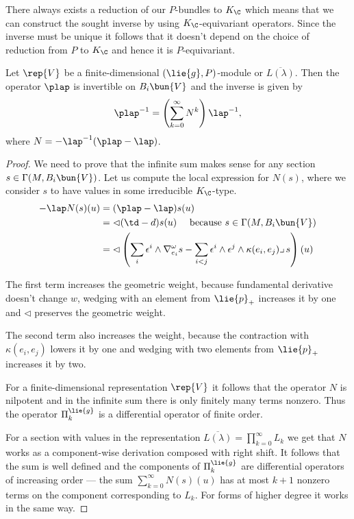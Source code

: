 There always exists a reduction of our $P$-bundles to $K_\C$ which means that we can construct the sought inverse by using $K_\C$-equivariant operators. Since the inverse must be unique it follows that it doesn't depend on the choice of reduction from $P$ to $K_\C$ and hence it is $P$-equivariant.

\begin{lemma}
Let $\rep{V}$  be a finite-dimensional $(\lie{g},P)$-module or $\overline{L(\lambda)}$. Then the operator $\plap$ is invertible on $B_i\bun{V}$ and the inverse is given by
\[
 \plap^{-1}=\left( \sum_{k=0}^\infty N^k \right) \lap^{-1},
\]
where $N=-\lap^{-1}(\plap-\lap)$.
\end{lemma}
\begin{proof}
 We need to prove that the infinite sum makes sense for any section $s\in\Gamma(M,B_{i}\bun{V})$. Let us compute the local expression for $N(s)$, where we consider $s$ to have values in some irreducible $K_\C$-type.
\begin{align*}
 -\lap N(s)(u) &= (\plap - \lap) s (u)\\
	    &= \lhd(\td - d) s (u) \quad\text{ because $s\in\Gamma(M,B_{i}\bun{V})$}\\
	  &= \lhd\left(\sum_i\epsilon^i\wedge\nabla^\omega_{e_i}s - \sum_{i <j} \epsilon^i\wedge\epsilon^j\wedge\kappa(e_i,e_j)  \lrcorner\, s \right)(u)
\end{align*}

 The first term increases the geometric weight, because fundamental derivative doesn't change $w$, wedging with an element from $\lie{p}_+$ increases it by one and $\lhd$ preserves the geometric weight.

The second term also increases the weight, because the contraction with $\kappa(e_i,e_j)$ lowers it by one and wedging with two elements from $\lie{p}_+$ increases it by two.

For a finite-dimensional representation $\rep{V}$ it follows that the operator $N$ is nilpotent and in the infinite sum there is only finitely many terms nonzero. Thus the operator $\Pi^\lie{g}_k$ is a differential operator of finite order.

For a section with values in the representation $\overline{L(\lambda)} = \prod_{k=0}^\infty L_k$ we get that $N$ works as a component-wise derivation composed with right shift. It follows that the sum is well defined and the components  of $\Pi^\lie{g}_k$ are differential operators of increasing order --- the sum $\sum_{k=0}^\infty N(s)(u)$ has at most $k+1$ nonzero terms on the component corresponding to $L_k$. For forms of higher degree it works in the same way.
\end{proof}


